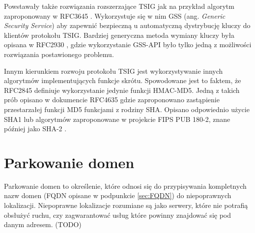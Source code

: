 Powstawały także rozwiązania rozszerzające TSIG jak na przykład algorytm zaproponowany w RFC3645 \cite{RFC3645}. Wykorzystuje się
w nim GSS \cite{RFC2743}(ang. \textit{Generic Security Service}) aby zapewnić bezpieczną u automatyczną dystrybucję kluczy do
klientów protokołu TSIG. Bardziej generyczna metoda wymiany kluczy była opisana w RFC2930 \cite{RFC2930}, gdzie wykorzystanie
GSS-API było tylko jedną z możliwości rozwiązania postawionego problemu.

Innym kierunkiem rozwoju protokołu TSIG jest wykorzystywanie innych algorytmów implementujących funkcje skrótu. Spowodowane
jest to faktem, że RFC2845 \cite{RFC2845} definiuje wykorzystanie jedynie funkcji HMAC-MD5. Jedną z takich prób opisano w
dokumencie RFC4635 \cite{RFC4635} gdzie zaproponowano zastąpienie przestarzałej funkcji MD5 funkcjami z rodziny SHA. Opisano
odpowiednio użycie SHA1 \cite{RFC3174} lub algorytmów zaproponowane w projekcie FIPS PUB 180-2, znane później jako SHA-2 \cite{RFC4634}.

\section{Parkowanie domen}
Parkowanie domen to określenie, które odnosi się do przypisywania kompletnych nazw domen (FQDN opisane w podpunkcie \ref{sec:FQDN})
do niepoprawnych lokalizacji. Niepoprawne lokalizacje rozumiane są jako serwery, które nie potrafią obsłużyć ruchu, czy zagwarantować
usług które powinny znajdować się pod danym adresem. (TODO)
